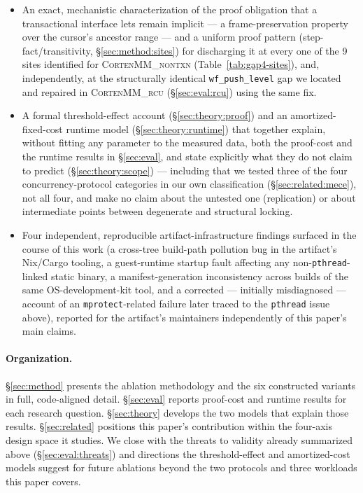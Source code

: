 \documentclass[10pt]{article}
\newcommand{\corten}[1]{\textsc{CortenMM\_#1}}
\newcommand{\vfn}[1]{\texttt{#1}}
\begin{document}
\begin{itemize}
  \item An exact, mechanistic characterization of the proof obligation
    that a transactional interface lets remain implicit --- a
    frame-preservation property over the cursor's ancestor range --- and
    a uniform proof pattern (step-fact/transitivity,
    \S\ref{sec:method:sites}) for discharging it at every one of the 9
    sites identified for \corten{nontxn} (Table~\ref{tab:gap4-sites}),
    and, independently, at the structurally identical
    \vfn{wf\_push\_level} gap we located and repaired in \corten{rcu}
    (\S\ref{sec:eval:rcu}) using the same fix.
  \item A formal threshold-effect account (\S\ref{sec:theory:proof})
    and an amortized-fixed-cost runtime model
    (\S\ref{sec:theory:runtime}) that together explain, without fitting
    any parameter to the measured data, both the proof-cost and the
    runtime results in \S\ref{sec:eval}, and state explicitly what they
    do not claim to predict (\S\ref{sec:theory:scope}) --- including
    that we tested three of the four concurrency-protocol categories in
    our own classification (\S\ref{sec:related:mece}), not all four,
    and make no claim about the untested one (replication) or about
    intermediate points between degenerate and structural locking.
  \item Four independent, reproducible artifact-infrastructure findings
    surfaced in the course of this work (a cross-tree build-path
    pollution bug in the artifact's Nix/Cargo tooling, a guest-runtime
    startup fault affecting any non-\vfn{pthread}-linked static
    binary, a manifest-generation inconsistency across builds of the
    same OS-development-kit tool, and a corrected --- initially
    misdiagnosed --- account of an \vfn{mprotect}-related failure later
    traced to the \vfn{pthread} issue above), reported for the
    artifact's maintainers independently of this paper's main claims.
\end{itemize}

\paragraph{Organization.} \S\ref{sec:method} presents the ablation
methodology and the six constructed variants in full, code-aligned
detail. \S\ref{sec:eval} reports proof-cost and runtime results for
each research question. \S\ref{sec:theory} develops the two models that
explain those results. \S\ref{sec:related} positions this paper's
contribution within the four-axis design space it studies. We close
with the threats to validity already summarized above
(\S\ref{sec:eval:threats}) and directions the threshold-effect and
amortized-cost models suggest for future ablations beyond the two
protocols and three workloads this paper covers.
\end{document}
